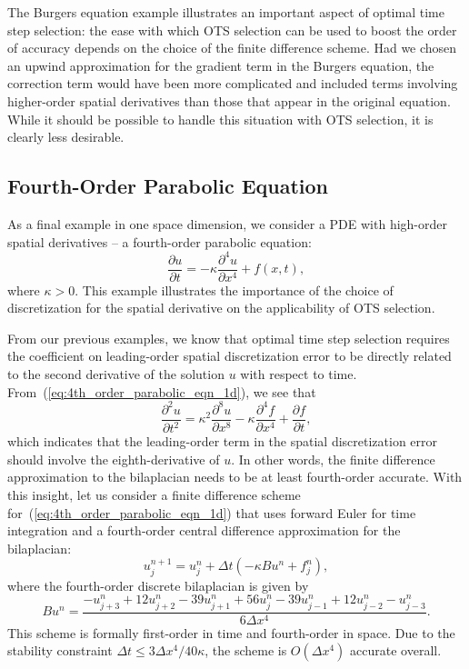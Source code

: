 \documentclass[fleqn,12pt,twoside]{article}
\newcommand{\beq}{\begin{equation}}
\newcommand{\eeq}{\end{equation}}
\def\pt{\partial t}
\def\px{\partial x}
\def\dt{\Delta t}
\def\dx{\Delta x}
\begin{document}
The Burgers equation example illustrates an important aspect of optimal time 
step selection: the ease with which OTS selection can be used to boost the 
order of accuracy depends on the choice of the finite difference scheme.  
Had we chosen an upwind approximation for the gradient term in the Burgers 
equation, the correction term would have been more complicated and included 
terms involving higher-order spatial derivatives than those that appear in the
original equation.  While it should be possible to handle this situation with 
OTS selection, it is clearly less desirable.


\subsection{Fourth-Order Parabolic Equation}
As a final example in one space dimension, we consider a PDE with high-order
spatial derivatives -- a fourth-order parabolic equation: 
\beq
  \frac{\partial u}{\pt} = -\kappa \frac{\partial^4 u}{\px^4} + f(x,t), 
  \label{eq:4th_order_parabolic_eqn_1d}
\eeq
where $\kappa > 0$.  This example illustrates the importance of the choice of
discretization for the spatial derivative on the applicability of OTS selection.

From our previous examples, we know that optimal time step selection requires 
the coefficient on leading-order spatial discretization error to be directly 
related to the second derivative of the solution $u$ with respect to time.  
From~(\ref{eq:4th_order_parabolic_eqn_1d}), we see that 
\beq
  \frac{\partial^2 u}{\pt^2} = 
    \kappa^2 \frac{\partial^8 u}{\px^8} 
  - \kappa \frac{\partial^4 f}{\px^4} 
  + \frac{\partial f}{\pt}
  \label{eq:4th_order_parabolic_eqn_1d_second_time_derivative},
\eeq
which indicates that the leading-order term in the spatial discretization 
error should involve the eighth-derivative of $u$.  In other words, the
finite difference approximation to the bilaplacian needs to be at least 
fourth-order accurate.  With this insight, let us consider a finite 
difference scheme for~(\ref{eq:4th_order_parabolic_eqn_1d}) that 
uses forward Euler for time integration and a fourth-order central 
difference approximation for the bilaplacian:
\beq
  u^{n+1}_j = u^{n}_j + \dt \left( -\kappa B u^n + f_j^n \right), 
  \label{eq:4th_order_parabolic_eqn_1d_FD_scheme}
\eeq
where the fourth-order discrete bilaplacian is given by
\beq
  B u^n = \frac{ -u^{n}_{j+3} + 12 u^{n}_{j+2} - 39 u^{n}_{j+1}
               + 56 u^{n}_j
               - 39 u^{n}_{j-1} + 12 u^{n}_{j-2} -u^{n}_{j-3} }
               {6 \dx^4}.
\eeq
This scheme is formally first-order in time and fourth-order in space.  
Due to the stability constraint $\dt \le 3\dx^4/40 \kappa$, the scheme is 
$O(\dx^4)$ accurate overall.
\end{document}

